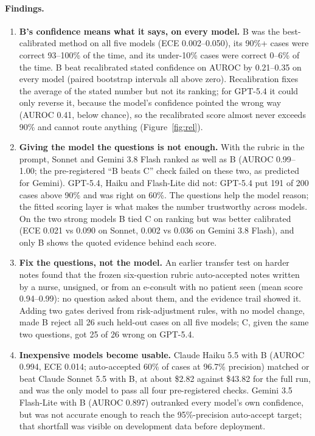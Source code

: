 \documentclass[10pt,letterpaper]{article}
\begin{document}
\filbreak
\paragraph{Findings.}
\begin{enumerate}
  \item \textbf{B's confidence means what it says, on every model.} B was the best-calibrated method on all five models (ECE 0.002--0.050), its 90\%+ cases were correct 93--100\% of the time, and its under-10\% cases were correct 0--6\% of the time. B beat recalibrated stated confidence on AUROC by 0.21--0.35 on every model (paired bootstrap intervals all above zero). Recalibration fixes the average of the stated number but not its ranking; for GPT-5.4 it could only reverse it, because the model's confidence pointed the wrong way (AUROC 0.41, below chance), so the recalibrated score almost never exceeds 90\% and cannot route anything (Figure~\ref{fig:rel}).
  \item \textbf{Giving the model the questions is not enough.} With the rubric in the prompt, Sonnet and Gemini 3.8 Flash ranked as well as B (AUROC 0.99--1.00; the pre-registered ``B beats C'' check failed on these two, as predicted for Gemini). GPT-5.4, Haiku and Flash-Lite did not: GPT-5.4 put 191 of 200 cases above 90\% and was right on 60\%. The questions help the model reason; the fitted scoring layer is what makes the number trustworthy across models. On the two strong models B tied C on ranking but was better calibrated (ECE 0.021 vs 0.090 on Sonnet, 0.002 vs 0.036 on Gemini 3.8 Flash), and only B shows the quoted evidence behind each score.
  \item \textbf{Fix the questions, not the model.} An earlier transfer test on harder notes found that the frozen six-question rubric auto-accepted notes written by a nurse, unsigned, or from an e-consult with no patient seen (mean score 0.94--0.99): no question asked about them, and the evidence trail showed it. Adding two gates derived from risk-adjustment rules, with no model change, made B reject all 26 such held-out cases on all five models; C, given the same two questions, got 25 of 26 wrong on GPT-5.4.
  \item \textbf{Inexpensive models become usable.} Claude Haiku 5.5 with B (AUROC 0.994, ECE 0.014; auto-accepted 60\% of cases at 96.7\% precision) matched or beat Claude Sonnet 5.5 with B, at about \$2.82 against \$43.82 for the full run, and was the only model to pass all four pre-registered checks. Gemini 3.5 Flash-Lite with B (AUROC 0.897) outranked every model's own confidence, but was not accurate enough to reach the 95\%-precision auto-accept target; that shortfall was visible on development data before deployment.
\end{enumerate}
\end{document}
